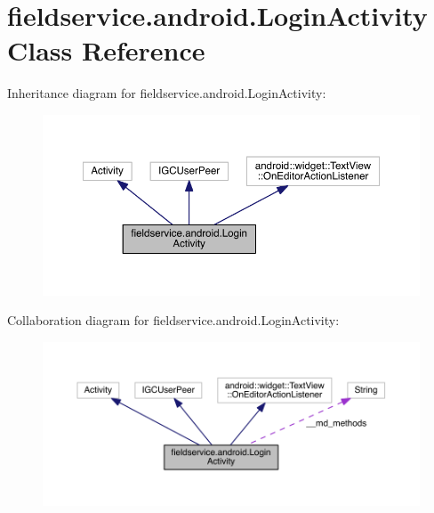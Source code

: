 \hypertarget{classfieldservice_1_1android_1_1_login_activity}{\section{fieldservice.\+android.\+Login\+Activity Class Reference}
\label{classfieldservice_1_1android_1_1_login_activity}
}


Inheritance diagram for fieldservice.\+android.\+Login\+Activity\+:
\nopagebreak
\begin{figure}[H]
\begin{center}
\leavevmode
\includegraphics[width=350pt]{classfieldservice_1_1android_1_1_login_activity__inherit__graph}
\end{center}
\end{figure}


Collaboration diagram for fieldservice.\+android.\+Login\+Activity\+:
\nopagebreak
\begin{figure}[H]
\begin{center}
\leavevmode
\includegraphics[width=350pt]{classfieldservice_1_1android_1_1_login_activity__coll__graph}
\end{center}
\end{figure}
